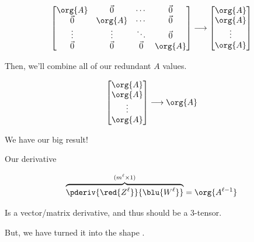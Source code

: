         \begin{equation}
            \begin{bmatrix}
                \org{A} & \vec{0} & \cdots  & \vec{0} \\
                \vec{0} & \org{A} & \cdots  & \vec{0} \\
                \vdots  & \vdots  & \ddots  & \vec{0} \\
                \vec{0} & \vec{0} & \vec{0} & \org{A}
            \end{bmatrix}
            \longrightarrow
            \begin{bmatrix}
                \org{A} \\ \org{A} \\ \vdots \\ \org{A} 
            \end{bmatrix}
        \end{equation}
        
        Then, we'll combine all of our redundant $A$ values.
        
        \begin{equation}
            \begin{bmatrix}
                \org{A} \\ \org{A} \\ \vdots \\ \org{A} 
            \end{bmatrix}
            \longrightarrow
            \org{A}
        \end{equation}
        
        We have our big result!\\
        
        \begin{notation}
            Our derivative
            
            \begin{equation*}
                \overbrace{
                    \pderiv {\red{Z^\ell}}   { \blu{W^{\ell}} } 
                }^{ (m^{\ell} \times 1) }
                = 
                \org{A^{\ell-1}}
            \end{equation*}
        
            Is a vector/matrix derivative, and thus should be a 3-tensor.
            
            But, we have turned it into the shape .
        \end{notation}
        
